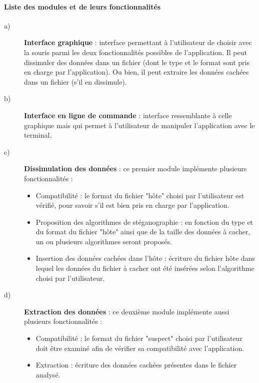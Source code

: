 \documentclass[11pt]{article}
\begin{document}
\paragraph{Liste des modules et de leurs fonctionnalités}
\begin{description}
\item[a)] \textbf{Interface graphique} : interface permettant à l'utilisateur de choisir avec la souris parmi les deux fonctionnalités possibles de l'application. 
Il peut dissimuler des données dans un fichier (dont le type et le format sont pris en charge par l'application). Ou bien, il peut extraire les données cachées dans un fichier (s'il en dissimule). 

\item[b)] \textbf{Interface en ligne de commande} : interface ressemblante à celle graphique mais qui permet à l'utilisateur de manipuler l'application avec le terminal. 

\item[c)] \textbf{Dissimulation des données} : ce premier module implémente plusieurs fonctionnalités : 
\begin{itemize}
\item Compatibilité : le format du fichier "hôte" choisi par l'utilisateur est vérifié, pour savoir s'il est bien pris en charge par l'application. 
\item Proposition des algorithmes de stéganographie : en fonction du type et du format du fichier "hôte" ainsi que de la taille des données à cacher, un ou plusieurs algorithmes seront proposés. 
\item Insertion des données cachées dans l'hôte : écriture du fichier hôte dans lequel les données du fichier à cacher ont été insérées selon l'algorithme choisi par l'utilisateur. 
\end{itemize}

\item[d)] \textbf{Extraction des données} : ce deuxième module implémente aussi plusieurs fonctionnalités : 
\begin{itemize}
\item Compatibilité : le format du fichier "suspect" choisi par l'utilisateur doit être examiné afin de vérifier sa compatibilité avec l'application. 
\item Extraction : écriture des données cachées présentes dans le fichier analysé. 
\end{itemize}

\end{description}
\end{document}
